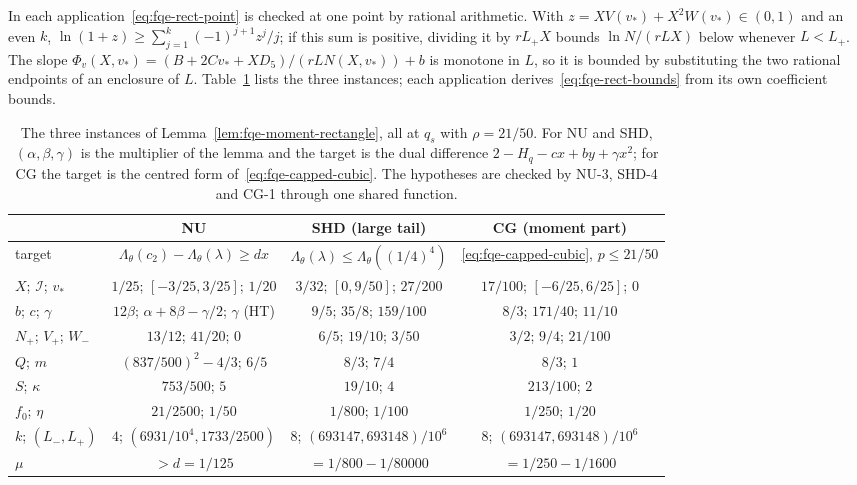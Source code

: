 In each application~\eqref{eq:fqe-rect-point} is checked at one point by rational arithmetic. With
$z=XV(v_*)+X^2W(v_*)\in(0,1)$ and an even $k$, $\ln(1+z)\ge\sum_{j=1}^k(-1)^{j+1}z^j/j$; if this sum is
positive, dividing it by $rL_+X$ bounds $\ln N/(rLX)$ below whenever $L<L_+$. The slope
$\Phi_v(X,v_*)=(B+2Cv_*+XD_5)/(rLN(X,v_*))+b$ is monotone in $L$, so it is bounded by substituting the two
rational endpoints of an enclosure of $L$. Table~\ref{tab:fqe-moment-rectangle} lists the three
instances; each application derives~\eqref{eq:fqe-rect-bounds} from its own coefficient bounds.
\begin{table}[htbp]
\centering\small
\begin{tabular}{@{}lccc@{}}
\toprule
 & NU & SHD (large tail) & CG (moment part)\\
\midrule
target & $\Lambda_\theta(c_2)-\Lambda_\theta(\lambda)\ge dx$ & $\Lambda_\theta(\lambda)\le\Lambda_\theta((1/4)^4)$ & \eqref{eq:fqe-capped-cubic}, $p\le21/50$\\
$X$; $\mathcal I$; $v_*$ & $1/25$; $[-3/25,3/25]$; $1/20$ & $3/32$; $[0,9/50]$; $27/200$ & $17/100$; $[-6/25,6/25]$; $0$\\
$b$; $c$; $\gamma$ & $12\beta$; $\alpha+8\beta-\gamma/2$; $\gamma$ (HT) & $9/5$; $35/8$; $159/100$ & $8/3$; $171/40$; $11/10$\\
$N_+$; $V_+$; $W_-$ & $13/12$; $41/20$; $0$ & $6/5$; $19/10$; $3/50$ & $3/2$; $9/4$; $21/100$\\
$Q$; $m$ & $(837/500)^2-4/3$; $6/5$ & $8/3$; $7/4$ & $8/3$; $1$\\
$S$; $\kappa$ & $753/500$; $5$ & $19/10$; $4$ & $213/100$; $2$\\
$f_0$; $\eta$ & $21/2500$; $1/50$ & $1/800$; $1/100$ & $1/250$; $1/20$\\
$k$; $(L_-,L_+)$ & $4$; $(6931/10^4,1733/2500)$ & $8$; $(693147,693148)/10^6$ & $8$; $(693147,693148)/10^6$\\
$\mu$ & $>d=1/125$ & $=1/800-1/80000$ & $=1/250-1/1600$\\
\bottomrule
\end{tabular}
\caption{The three instances of Lemma~\ref{lem:fqe-moment-rectangle}, all at $q_s$ with $\rho=21/50$.
For NU and SHD, $(\alpha,\beta,\gamma)$ is the multiplier of the lemma and the target is the dual
difference $2-H_q-cx+by+\gamma x^2$; for CG the target is the centred form of~\eqref{eq:fqe-capped-cubic}.
The hypotheses are checked by NU-3, SHD-4 and CG-1 through one shared function.}
\label{tab:fqe-moment-rectangle}
\end{table}

